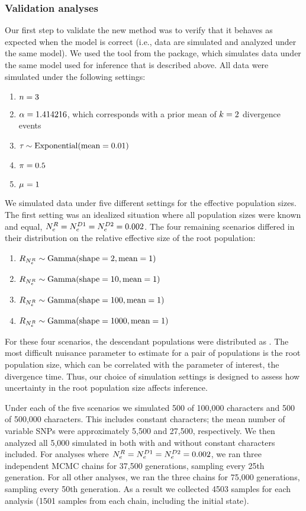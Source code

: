 \subsubsection{Validation analyses}
Our first step to validate the new method was to verify that it behaves as
expected when the model is correct (i.e., data are simulated and analyzed under
the same model).
We used the \simcoevolity tool from the \ecoevolity package, which simulates
data under the same model used for inference that is described above.
All data were simulated under the following settings:
\begin{enumerate}
    \item $\ncomparisons = 3$
    \item $\concentration = 1.414216$, which corresponds with a prior mean of
        $\nevents = 2$ divergence events
    \item $\divtime \sim \dexponential{0.01}$
    \item $\gfreq = 0.5$
    \item $\murate = 1$
\end{enumerate}
We simulated data under five different settings for the effective population
sizes.
The first setting was an idealized situation where all population sizes were
known and equal,
$\epopsize[\rootpopindex] = 
\epopsize[\descendantpopindex{1}] =
\epopsize[\descendantpopindex{2}] = 0.002$.
The four remaining scenarios differed in their distribution on the relative
effective size of the root population:
\begin{enumerate}
    \item $\rootrelativepopsize \sim \dgamma{2}{1}$
    \item $\rootrelativepopsize \sim \dgamma{10}{1}$
    \item $\rootrelativepopsize \sim \dgamma{100}{1}$
    \item $\rootrelativepopsize \sim \dgamma{1000}{1}$
\end{enumerate}
For these four scenarios, the descendant populations were distributed as
.
The most difficult nuisance parameter to estimate for a pair of populations is
the root population size, which can be correlated with the parameter of
interest, the divergence time.
Thus, our choice of simulation settings is designed to assess how uncertainty
in the root population size affects inference.

Under each of the five scenarios we simulated 500 \datasets of 100,000
characters and 500 \datasets of 500,000 characters.
This includes constant characters; the mean number of variable SNPs were
approximately 5,500 and 27,500, respectively.
We then analyzed all 5,000 simulated \datasets in \ecoevolity both with and
without constant characters included.
For analyses where 
$\epopsize[\rootpopindex] = 
\epopsize[\descendantpopindex{1}] =
\epopsize[\descendantpopindex{2}] = 0.002$,
we ran
three independent MCMC chains for 37,500 generations, sampling every
25th generation.
For all other analyses, we ran the three chains for 75,000 generations,
sampling every 50th generation.
As a result we collected 4503 samples for each analysis (1501 samples from each
chain, including the initial state).

